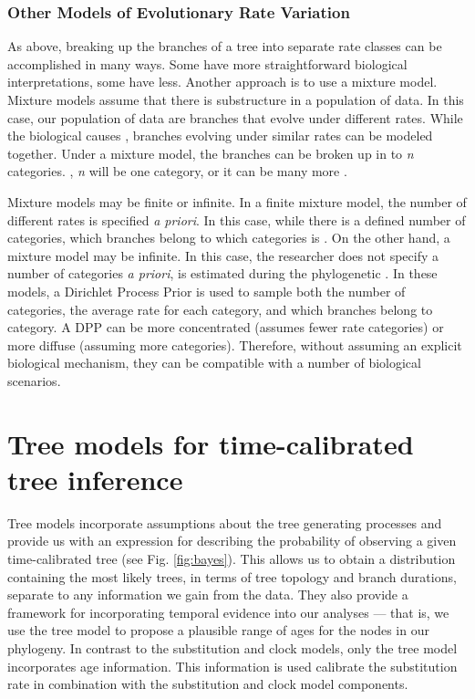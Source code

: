 \subsubsection{Other Models of Evolutionary Rate Variation}

As  above, breaking up the branches of a tree into separate rate classes can be accomplished in many ways.
Some have more straightforward biological interpretations, some have less.
Another approach is to use a mixture model.
Mixture models assume that there is substructure in a population of data.
In this case, our population of data are branches that evolve under different rates.
While the biological causes , branches evolving under similar rates can be modeled together.
Under a mixture model, the branches can be broken up in to \textit{n} categories.
, \textit{n} will be one category, or it can be many more .

Mixture models may be finite or infinite.
In a finite mixture model, the number of different rates is specified \textit{a priori}.
In this case, while there is a defined number of categories, which branches belong to which categories is .
On the other hand, a mixture model may be infinite.
In this case, the researcher does not specify a number of categories \textit{a priori},  is estimated during the phylogenetic  \citep{Heath2012a}.
In these models, a Dirichlet Process Prior  is used to sample both the number of categories, the average rate for each category, and which branches belong to  category.
A DPP can be more concentrated (assumes fewer rate categories) or more diffuse (assuming more categories).
Therefore, without assuming an explicit biological mechanism, they can be compatible with a number of biological scenarios.

\section{Tree models for time-calibrated tree inference}


Tree models incorporate assumptions about the tree generating processes and provide us with an expression for describing the probability of observing a given time-calibrated tree (see Fig. \ref{fig:bayes}). This allows us to obtain a distribution containing the most likely trees, in terms of tree topology and branch durations, separate to any information we gain from the  data.
They also provide a framework for incorporating temporal evidence into our analyses --- that is, we use the tree model to propose a plausible range of ages for the nodes in our phylogeny.
In contrast to the substitution and clock models, only the tree model incorporates age information. %
This information is used  calibrate the substitution rate in combination with the substitution and clock model components.

